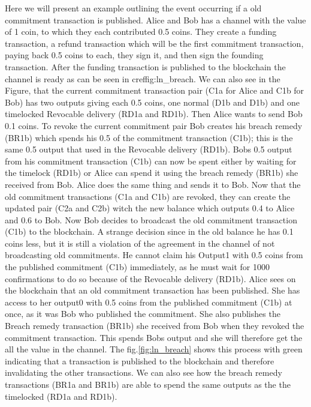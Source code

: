Here we will present an example outlining the event occurring if a old commitment transaction is published. Alice and Bob has a channel with the value of 1 coin, to which they each contributed 0.5 coins. They create a funding transaction, a refund transaction which will be the first commitment transaction, paying back 0.5 coins to each, they sign it, and then sign the founding transaction. After the funding transaction is published to the blockchain the channel is ready as can be seen in cref{fig:ln_breach}. We can also see in the Figure, that the current commitment transaction pair (C1a for Alice and C1b for Bob) has two outputs giving each 0.5 coins, one normal (D1b and D1b) and one timelocked Revocable delivery (RD1a and RD1b). Then Alice wants to send Bob 0.1 coins. To revoke the current commitment pair Bob creates his breach remedy (BR1b) which spends his 0.5 of the commitment transaction (C1b); this is the same 0.5 output that used in the Revocable delivery (RD1b). Bobs 0.5 output from his commitment transaction (C1b) can now be spent either by waiting for the timelock (RD1b) or Alice can spend it using the breach remedy (BR1b) she received from Bob.
Alice does the same thing and sends it to Bob. Now that the old commitment transactions (C1a and C1b) are revoked, they can create the updated pair (C2a and C2b) witch the new balance which outputs 0.4 to Alice and 0.6 to Bob. Now Bob decides to broadcast the old commitment transaction (C1b) to the blockchain. A strange decision since in the old balance he has 0.1 coins less, but it is still a violation of the agreement in the channel of not broadcasting old commitments. 
He cannot claim his Output1 with 0.5 coins from the published commitment (C1b) immediately, as he must wait for 1000 confirmations to do so because of the Revocable delivery (RD1b).
Alice sees on the blockchain that an old commitment transaction has been published. She has access to her output0 with  0.5 coins from the published commitment (C1b) at once, as it was Bob who published the commitment. She also publishes the Breach remedy transaction (BR1b) she received from Bob when they revoked the commitment transaction. This spends Bobs output and she will therefore get the all the value in the channel. The fig.\ref{fig:ln_breach} shows this process with green indicating that a transaction is published to the blockchain and therefore invalidating the other transactions. We can also see how the breach remedy transactions (BR1a and BR1b) are able to spend the same outputs as the the timelocked (RD1a and RD1b).


